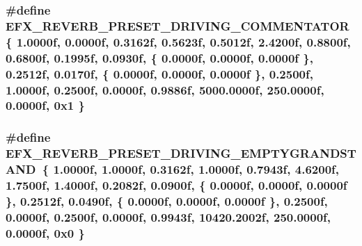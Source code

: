\subsubsection[{\texorpdfstring{E\+F\+X\+\_\+\+R\+E\+V\+E\+R\+B\+\_\+\+P\+R\+E\+S\+E\+T\+\_\+\+D\+R\+I\+V\+I\+N\+G\+\_\+\+C\+O\+M\+M\+E\+N\+T\+A\+T\+OR}{EFX_REVERB_PRESET_DRIVING_COMMENTATOR}}]{\setlength{\rightskip}{0pt plus 5cm}\#define E\+F\+X\+\_\+\+R\+E\+V\+E\+R\+B\+\_\+\+P\+R\+E\+S\+E\+T\+\_\+\+D\+R\+I\+V\+I\+N\+G\+\_\+\+C\+O\+M\+M\+E\+N\+T\+A\+T\+OR~\{ 1.\+0000f, 0.\+0000f, 0.\+3162f, 0.\+5623f, 0.\+5012f, 2.\+4200f, 0.\+8800f, 0.\+6800f, 0.\+1995f, 0.\+0930f, \{ 0.\+0000f, 0.\+0000f, 0.\+0000f \}, 0.\+2512f, 0.\+0170f, \{ 0.\+0000f, 0.\+0000f, 0.\+0000f \}, 0.\+2500f, 1.\+0000f, 0.\+2500f, 0.\+0000f, 0.\+9886f, 5000.\+0000f, 250.\+0000f, 0.\+0000f, 0x1 \}}\hypertarget{efx-presets_8h_a77cd5d3ce31ec580e5b77b3fa69cc79a}{}\label{efx-presets_8h_a77cd5d3ce31ec580e5b77b3fa69cc79a}
\subsubsection[{\texorpdfstring{E\+F\+X\+\_\+\+R\+E\+V\+E\+R\+B\+\_\+\+P\+R\+E\+S\+E\+T\+\_\+\+D\+R\+I\+V\+I\+N\+G\+\_\+\+E\+M\+P\+T\+Y\+G\+R\+A\+N\+D\+S\+T\+A\+ND}{EFX_REVERB_PRESET_DRIVING_EMPTYGRANDSTAND}}]{\setlength{\rightskip}{0pt plus 5cm}\#define E\+F\+X\+\_\+\+R\+E\+V\+E\+R\+B\+\_\+\+P\+R\+E\+S\+E\+T\+\_\+\+D\+R\+I\+V\+I\+N\+G\+\_\+\+E\+M\+P\+T\+Y\+G\+R\+A\+N\+D\+S\+T\+A\+ND~\{ 1.\+0000f, 1.\+0000f, 0.\+3162f, 1.\+0000f, 0.\+7943f, 4.\+6200f, 1.\+7500f, 1.\+4000f, 0.\+2082f, 0.\+0900f, \{ 0.\+0000f, 0.\+0000f, 0.\+0000f \}, 0.\+2512f, 0.\+0490f, \{ 0.\+0000f, 0.\+0000f, 0.\+0000f \}, 0.\+2500f, 0.\+0000f, 0.\+2500f, 0.\+0000f, 0.\+9943f, 10420.\+2002f, 250.\+0000f, 0.\+0000f, 0x0 \}}\hypertarget{efx-presets_8h_abf3d74db7c07cfbe62e57ac41933fe16}{}\label{efx-presets_8h_abf3d74db7c07cfbe62e57ac41933fe16}
